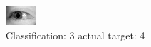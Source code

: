 \begin{figure}[h!]
\begin{center}
\includegraphics[width=0.60\columnwidth]{figures/ID3123_class_3_target_4.png}
\end{center}
\caption{ Classification: 3 actual target: 4}
\label{fig:ID3123_class_3_target_4}
\end{figure}
